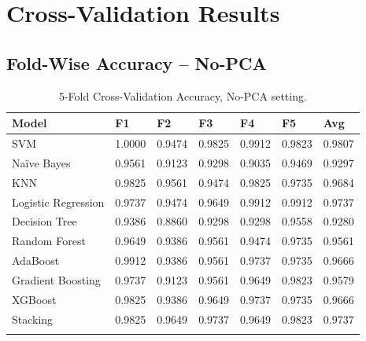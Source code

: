 \documentclass[12pt,a4paper]{article}
\begin{document}
\section{Cross-Validation Results}

\subsection{Fold-Wise Accuracy -- No-PCA}
\begin{longtable}{|p{2.6cm}|p{1.1cm}p{1.1cm}p{1.1cm}p{1.1cm}p{1.1cm}|p{1.4cm}|}
\hline
\textbf{Model} & \textbf{F1} & \textbf{F2} & \textbf{F3} & \textbf{F4} & \textbf{F5} & \textbf{Avg} \\ \hline
SVM & 1.0000 & 0.9474 & 0.9825 & 0.9912 & 0.9823 & 0.9807 \\
Na\"ive Bayes & 0.9561 & 0.9123 & 0.9298 & 0.9035 & 0.9469 & 0.9297 \\
KNN & 0.9825 & 0.9561 & 0.9474 & 0.9825 & 0.9735 & 0.9684 \\
Logistic Regression & 0.9737 & 0.9474 & 0.9649 & 0.9912 & 0.9912 & 0.9737 \\
Decision Tree & 0.9386 & 0.8860 & 0.9298 & 0.9298 & 0.9558 & 0.9280 \\
Random Forest & 0.9649 & 0.9386 & 0.9561 & 0.9474 & 0.9735 & 0.9561 \\
AdaBoost & 0.9912 & 0.9386 & 0.9561 & 0.9737 & 0.9735 & 0.9666 \\
Gradient Boosting & 0.9737 & 0.9123 & 0.9561 & 0.9649 & 0.9823 & 0.9579 \\
XGBoost & 0.9825 & 0.9386 & 0.9649 & 0.9737 & 0.9735 & 0.9666 \\
Stacking & 0.9825 & 0.9649 & 0.9737 & 0.9649 & 0.9823 & 0.9737 \\
\hline
\caption{5-Fold Cross-Validation Accuracy, No-PCA setting.}
\label{tab:cv-nopca}
\end{longtable}
\end{document}
